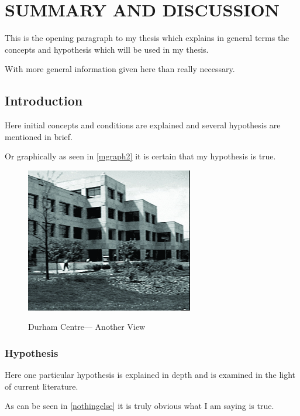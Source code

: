 \chapter{SUMMARY AND DISCUSSION}

This is the opening paragraph to my thesis which
explains in general terms the concepts and hypothesis
which will be used in my thesis.

With more general information given here than really
necessary.

\section{Introduction}

Here initial concepts and conditions are explained and
several hypothesis are mentioned in brief.

Or graphically as seen in \autoref{mgraph2}
it is certain that my hypothesis is true.


\begin{figure}[h!tb] \centering
    \includegraphics[alt={This is alt text}]{Images/dc5}

    \caption{Durham Centre---  Another View}
    \label{mgraph2}
\end{figure}

\subsection{Hypothesis}

Here one particular hypothesis is explained in depth
and is examined in the light of current literature.

As can be seen in \autoref{nothingelse} it is
truly obvious what I am saying is true.

